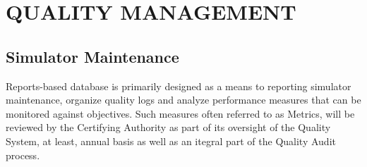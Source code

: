 \chapter{QUALITY MANAGEMENT}

\renewcommand{\headrulewidth}{0.5pt}
\renewcommand{\footrulewidth}{0.5pt}
\thispagestyle{plain}
\pagestyle{fancy}
\fancyhf{}
\raggedright
{}

\section{Simulator Maintenance}
    Reports-based database is primarily designed as a means to reporting simulator maintenance, organize quality logs and analyze 
    performance measures that can be monitored against objectives. Such measures often referred to as Metrics, will be reviewed by 
    the Certifying Authority as part of its oversight of the Quality System, at least, annual basis as well as an itegral part of 
    the Quality Audit process.
